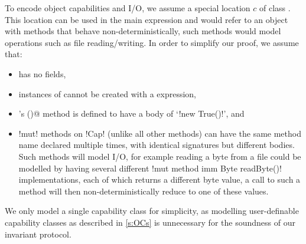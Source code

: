\noindent To encode object capabilities and I/O, we assume a special location  $c$ of class \Q@Cap@. This location can be used in the main expression and would refer to an object with methods that behave non-deterministically, such methods would model operations such as file reading/writing. In order to simplify our proof, we assume that:
\begin{itemize}
	\item \Q@Cap@ has no fields,
	\item instances of \Q@Cap@ cannot be created with a \Q@new@ expression,
	\item \Q@Cap@'s \Q@invariant()@ method is defined to have a body of `\Q!new True()!', and
	

	
	\item \Q!mut! methods on \Q!Cap! (unlike all other methods) can have the same method name declared multiple times, with identical signatures but different bodies.
	Such methods will model I/O, for example reading a byte from a file could be modelled by having several different \Q!mut method imm Byte readByte()! implementations, each of which returns a different byte value,
	a call to such a method will then non-deterministically reduce to one of these values.
\end{itemize}
We only model a single \Q@Cap@ capability class for simplicity, as modelling user-definable capability classes as described in \autoref{s:OCs} is unnecessary for the soundness of our invariant protocol.


